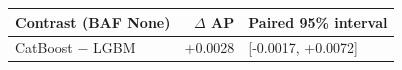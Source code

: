 \begin{tabular}{@{}l r l@{}}
\toprule
Contrast (BAF None) & $\Delta$ AP & Paired 95\% interval \\
\midrule
CatBoost $-$ LGBM & +0.0028 & [-0.0017, +0.0072] \\
\bottomrule
\end{tabular}
